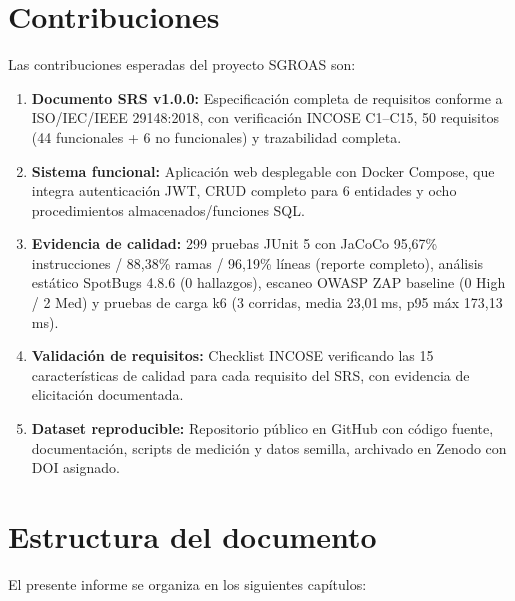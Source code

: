 \section{Contribuciones}
\label{sec:contribuciones}

Las contribuciones esperadas del proyecto SGROAS son:

\begin{enumerate}
  \item \textbf{Documento SRS v1.0.0:} Especificación completa de requisitos conforme a ISO/IEC/IEEE 29148:2018, con verificación INCOSE C1--C15, 50 requisitos (44 funcionales + 6 no funcionales) y trazabilidad completa.

  \item \textbf{Sistema funcional:} Aplicación web desplegable con Docker Compose, que integra autenticación JWT, CRUD completo para 6 entidades y ocho procedimientos almacenados/funciones SQL.

  \item \textbf{Evidencia de calidad:} 299 pruebas JUnit 5 con JaCoCo 95,67\% instrucciones / 88,38\% ramas / 96,19\% líneas (reporte completo), análisis estático SpotBugs 4.8.6 (0 hallazgos), escaneo OWASP ZAP baseline (0 High / 2 Med) y pruebas de carga k6 (3 corridas, media 23,01\,ms, p95 máx 173,13\,ms).

  \item \textbf{Validación de requisitos:} Checklist INCOSE verificando las 15 características de calidad para cada requisito del SRS, con evidencia de elicitación documentada.

  \item \textbf{Dataset reproducible:} Repositorio público en GitHub con código fuente, documentación, scripts de medición y datos semilla, archivado en Zenodo con DOI asignado.
\end{enumerate}

\section{Estructura del documento}
\label{sec:estructura}

El presente informe se organiza en los siguientes capítulos:

